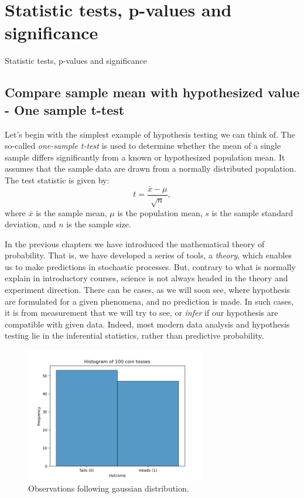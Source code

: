 \documentclass{book}
\begin{document}
\newpage
\section{Statistic tests, p-values and significance}
Statistic tests, p-values and significance

\subsection{Compare sample mean with hypothesized value - One sample t-test}

Let's begin with the simplest example of hypothesis testing we can think of. The so-called \textit{one-sample t-test} is used to determine whether the mean of a single sample differs significantly from a known or hypothesized population mean. It assumes that the sample data are drawn from a normally distributed population. The test statistic is given by:
\[
    t = \frac{\bar{x} - \mu}{\sqrt{n}},
\]
where $\bar{x}$ is the sample mean, $\mu$ is the population mean, $s$ is the sample standard deviation, and $n$ is the sample size.

In the previous chapters we have introduced the mathematical theory of probability. That is, we have developed a series of tools, a \textit{theory}, which enables us to make predictions in stochastic processes. But, contrary to what is normally explain in introductory courses, science is not always headed in the theory and experiment direction. There can be cases, as we will soon see, where hypothesis are formulated for a given phenomena, and no prediction is made. In such cases, it is from measurement that we will try to see, or \textit{infer} if our hypothesis are compatible with given data. Indeed, most modern data analysis and hypothesis testing lie in the inferential statistics, rather than predictive probability.

\begin{figure}[ht]
    \centering
    \includegraphics[width=0.7\textwidth]{figures/chapter4/t_1_sample_observations.png}
    \caption{Observations following gaussian distribution.}
    \label{fig:t_1_sample_obs}
\end{figure}
\end{document}
